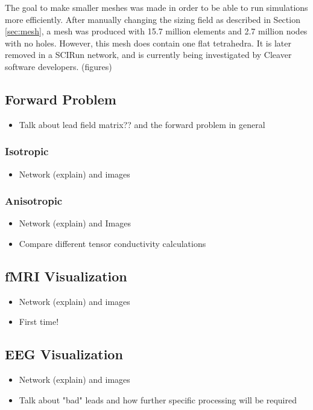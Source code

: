 The goal to make smaller meshes was made in order to be able to run simulations more efficiently. After manually changing the sizing field as described in Section \ref{sec:mesh}, a mesh was produced with 15.7 million elements and 2.7 million nodes with no holes. However, this mesh does contain one flat tetrahedra. It is later removed in a SCIRun network, and is currently being investigated by Cleaver software developers. (figures)

\subsection{Forward Problem}

\begin{itemize}
\item Talk about lead field matrix?? and the forward problem in general
\end{itemize}

\subsubsection{Isotropic}

\begin{itemize}

\item Network (explain) and images

\end{itemize}

\subsubsection{Anisotropic}

\begin{itemize}

\item Network (explain) and Images

\item Compare different tensor conductivity calculations

\end{itemize}

\subsection{fMRI Visualization}

\begin{itemize}

\item Network (explain) and images

\item First time!

\end{itemize}

\subsection{EEG Visualization}

\begin{itemize}

\item Network (explain) and images

\item Talk about "bad" leads and how further specific processing will be required

\end{itemize}




